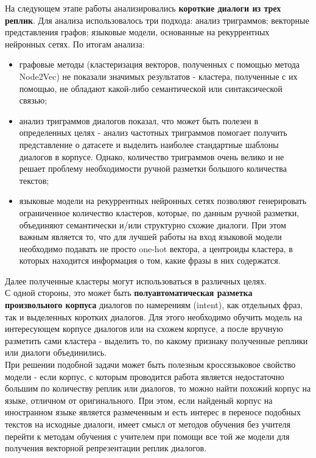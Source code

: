 \documentclass[a4paper,14pt]{article}
\begin{document}
\begin{justify}
\indent
На следующем этапе работы анализировались \textbf{короткие диалоги из трех реплик}. Для анализа использовалось три подхода: анализ триграммов; векторные представления графов; языковые модели, основанные на рекуррентных нейронных сетях. По итогам анализа:
\begin{itemize}
\item графовые методы (кластеризация векторов, полученных с помощью метода Node2Vec) не показали значимых результатов - кластера, полученные с их помощью, не обладают какой-либо семантической или синтаксической связью;
\item анализ триграммов диалогов показал, что может быть полезен в определенных целях - анализ частотных триграммов помогает получить представление о датасете и выделить наиболее стандартные шаблоны диалогов в корпусе. Однако, количество триграммов очень велико и не решает проблему необходимости ручной разметки большого количества текстов;   
\item языковые модели на рекуррентных нейронных сетях позволяют генерировать ограниченное количество кластеров, которые, по данным ручной разметки, объединяют семантически и/или структурно схожие диалоги. При этом важным является то, что для лучшей работы на вход языковой модели необходимо подавать не просто one-hot вектора, а центроиды кластера, в которых находится информация о том, какие фразы в них содержатся.
\end{itemize}
\indent
Далее полученные кластеры могут использоваться в различных целях. \\
\indent
С одной стороны, это может быть \textbf{полуавтоматическая разметка произвольного корпуса} диалогов по намерениям (intent), как отдельных фраз, так и выделенных коротких диалогов.  Для этого необходимо обучить модель на интересующем корпусе диалогов или на схожем корпусе, а после вручную разметить сами кластера - выделить то, по какому признаку полученные реплики или диалоги объединились. \\
\indent 
При решении подобной задачи может быть полезным кроссязыковое свойство модели - если корпус, с которым проводится работа является недостаточно большим по количеству реплик или диалогов, то можно найти похожий корпус на языке, отличном от оригинального. При этом, если найденый корпус на иностранном языке является размеченным и есть интерес в переносе подобных текстов на исходные диалоги, имеет смысл от методов обучения без учителя перейти к методам обучения с учителем при помощи все той же модели для получения векторной репрезентации реплик диалогов. \\

\end{justify}
\end{document}
